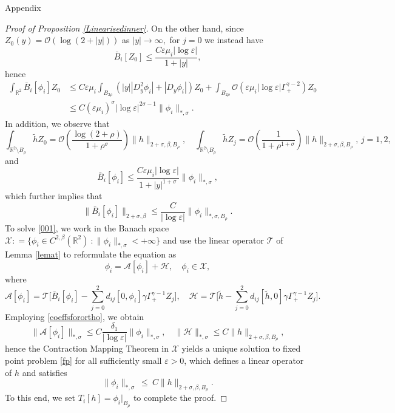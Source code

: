 \documentclass[11pt,reqno,a4paper]{amsart}
\numberwithin{equation}{section}
\newcommand{\R}{\mathbb{R}}
\newcommand{\defeq}{\mathrel{\mathop:}=}
\newcommand{\ve}{\varepsilon}
\newcommand{\be}{\begin{equation}}
\newcommand{\ee}{\end{equation}}
\begin{document}
\begin{section}{Appendix}
\begin{proof}[Proof of Proposition \ref{Linearisedinner}]
On the other hand, since $Z_0(y)=\mathcal{O}\left(\log\left(2+|y|\right)\right)$ as $|y|\to\infty,$ for $j=0$ we instead have
 \[\bar{B}_i[Z_0]\leq \frac{C\ve\mu_i|\log\ve|}{1+|y|},\]
 hence
 \begin{equation*}
 \begin{aligned}
\int_{\R^2} \bar{B}_i[\phi_{i}]Z_0 &\leq C\ve\mu_i\int_{B_{2\rho}} \left(|y||D^2_{y}\phi_{i}|+|D_{y}\phi_{i}|\right)Z_0 +\int_{B_{2\rho}} \mathcal{O}\left(\ve\mu_i|\log\ve| \Gamma^{\gamma-2}_{+}\right)Z_0\\
&\leq C\left(\ve\mu_i\right)^{\sigma}|\log\ve|^{2\sigma-1}\|\phi_{i}\|_{*,\sigma}.
\end{aligned}
\end{equation*}
In addition, we observe that
\[\int_{\R^2\setminus B_{\rho}} \tilde{h}Z_0=\mathcal{O}\left(\frac{\log(2+\rho)}{1+\rho^{\sigma}}\right)\|h\|_{2+\sigma,\beta,B_{\rho}}, \quad \int_{\R^2\setminus B_{\rho}} \tilde{h}Z_j=\mathcal{O}\left(\frac{1}{1+\rho^{1+\sigma}}\right)\|h\|_{2+\sigma,\beta,B_{\rho}}, \, j=1,2,\]
and 
\[\bar{B}_i[\phi_{i}] \leq\frac{C\ve\mu_i|\log\ve|}{1+|y|^{1+\sigma}}\|\phi_{i}\|_{*,\sigma},\]
which further implies that  \[\big\| \bar{B}_i[\phi_{i}] \big\|_{2+\sigma,\beta} \leq \frac{C}{|\log\ve|}\|\phi_{i}\|_{*,\sigma,B_{\rho}}.\]
To solve \eqref{001}, we work in the Banach space $\mathcal{X}\defeq\{\phi_{i} \in C^{2,\beta}(\R^2)\ : 
  \|\phi_{i}\|_{*, \sigma} <+\infty\}$ and use the linear operator $\mathcal T$ of Lemma \ref{lemat} to reformulate the equation as 
\be\label{fp}
 \phi_{i}  =   \mathcal A  [\phi_{i}]  +  \mathcal {H},\quad \phi_{i} \in \mathcal{X},
\ee
where
$$
\mathcal A  [\phi_{i}]
 =  \mathcal T\Big [\bar{B}_i[\phi_{i}] -\sum_{j=0}^2 d_{ij}[0, \phi_{i}]\gamma\Gamma^{\gamma-1}_{+}Z_j  \Big] ,\quad
 \mathcal H  = \mathcal T\Big [  \tilde h   - \sum_{j=0}^2 d_{ij}[\tilde h,0] \gamma\Gamma^{\gamma-1}_{+}Z_j  \Big].
$$
Employing \eqref{coeffsforortho}, we obtain
\[\big\|\mathcal{A}[\phi_{i}]\big\|_{*,\sigma}\leq C\frac{\delta_1}{|\log\ve|}\|\phi_{i}\|_{*,\sigma},\quad \|\mathcal{H}\|_{*,\sigma}\leq C\|h\|_{2+\sigma,\beta,B_{\rho}},\]
hence the Contraction Mapping Theorem in $\mathcal{X}$ yields a unique solution to fixed point problem \eqref{fp} for all sufficiently small $\ve>0$, which defines a linear operator of $h$ and satisfies
$$
\|\phi_{i} \|_{*, \sigma} \ \le\  C \|h \|_{ 2+\sigma,\beta, B_{\rho}}.
$$
To this end, we set $T_i[h] = \phi_{i}\big|_{B_\rho}$ to complete the proof.
\end{proof}
\end{section}


\end{document}
